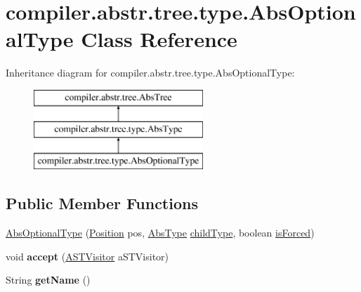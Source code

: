 \hypertarget{classcompiler_1_1abstr_1_1tree_1_1type_1_1_abs_optional_type}{}\section{compiler.\+abstr.\+tree.\+type.\+Abs\+Optional\+Type Class Reference}
\label{classcompiler_1_1abstr_1_1tree_1_1type_1_1_abs_optional_type}
Inheritance diagram for compiler.\+abstr.\+tree.\+type.\+Abs\+Optional\+Type\+:\begin{figure}[H]
\begin{center}
\leavevmode
\includegraphics[height=3.000000cm]{classcompiler_1_1abstr_1_1tree_1_1type_1_1_abs_optional_type}
\end{center}
\end{figure}
\subsection*{Public Member Functions}
\begin{DoxyCompactItemize}
\item 
\hyperlink{classcompiler_1_1abstr_1_1tree_1_1type_1_1_abs_optional_type_a735827bb81992b3c92aaa909d2d69680}{Abs\+Optional\+Type} (\hyperlink{classcompiler_1_1_position}{Position} pos, \hyperlink{classcompiler_1_1abstr_1_1tree_1_1type_1_1_abs_type}{Abs\+Type} \hyperlink{classcompiler_1_1abstr_1_1tree_1_1type_1_1_abs_optional_type_ad9d2dd30993f97aed9100007843ba313}{child\+Type}, boolean \hyperlink{classcompiler_1_1abstr_1_1tree_1_1type_1_1_abs_optional_type_a4a2576a002e4fc58799ceb9a484ad654}{is\+Forced})
\item 
\mbox{\label{classcompiler_1_1abstr_1_1tree_1_1type_1_1_abs_optional_type_a243a75eb2a1f5d1d38082c8f6a0639df}} 
void {\bfseries accept} (\hyperlink{interfacecompiler_1_1abstr_1_1_a_s_t_visitor}{A\+S\+T\+Visitor} a\+S\+T\+Visitor)
\item 
\mbox{\label{classcompiler_1_1abstr_1_1tree_1_1type_1_1_abs_optional_type_aea68cadc00031359bf0936fbfc6502e5}} 
String {\bfseries get\+Name} ()
\end{DoxyCompactItemize}
